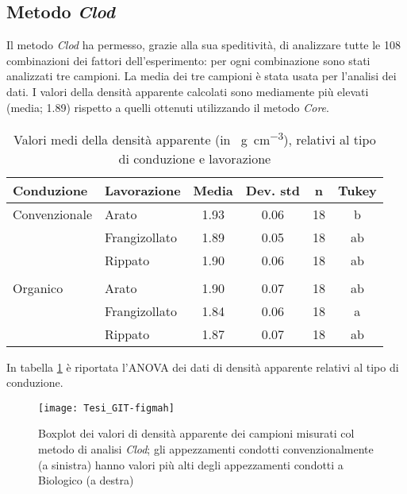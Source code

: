 \documentclass[a4paper]{article}
\begin{document}
\subsection{Metodo \emph{Clod}}


Il metodo \emph{Clod} ha permesso, grazie alla sua speditività, di
analizzare tutte le 108 combinazioni dei fattori dell'esperimento:
per ogni combinazione sono stati analizzati tre campioni. La media dei
tre campioni è stata usata per l'analisi dei dati.
I valori della densità apparente calcolati sono mediamente pi\`u elevati (media;
1.89)
rispetto a quelli ottenuti utilizzando il metodo \emph{Core}.


\begin{table}[ht]
\centering
\caption{Valori medi della densità apparente (in
\SI{}{\gram\per\cubic\centi\metre}),
relativi al tipo di conduzione e lavorazione } 
\label{tab:summaryClod}
\begin{tabular}{llcccc}
  \hline
Conduzione & Lavorazione & Media & Dev. std & n & Tukey \\ 
  \hline
Convenzionale & Arato & 1.93 & 0.06 &  18 & b \\ 
   & Frangizollato & 1.89 & 0.05 &  18 & ab \\ 
   & Rippato & 1.90 & 0.06 &  18 & ab \\ 
\\
  Organico & Arato & 1.90 & 0.07 &  18 & ab \\ 
   & Frangizollato & 1.84 & 0.06 &  18 & a \\ 
   & Rippato & 1.87 & 0.07 &  18 & ab \\ 
   \hline
\end{tabular}
\end{table}
In tabella \ref{tab:summaryClod} \`e riportata l'ANOVA dei dati di densità apparente 
relativi al tipo di conduzione.



\begin{figure}[ht]
  \centering
\texttt{[image: Tesi\_GIT-figmah]}
  \caption[Boxplot dei valori di densità apparente: metodo \emph{Clod}
  ]{Boxplot dei valori di densità apparente dei campioni misurati col metodo di
    analisi \emph{Clod}; gli appezzamenti condotti convenzionalmente (a
    sinistra) hanno valori più alti degli appezzamenti
    condotti a Biologico (a destra)}
  \label{fig:boxplotClod}

\end{figure}
\FloatBarrier
\end{document}
